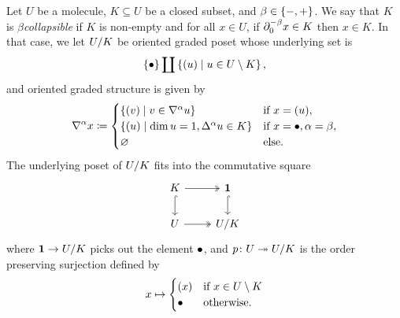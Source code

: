 \begin{dfn}  \label{dfn:collapsible}
    Let \( U \) be a molecule, \( K \subseteq U \) be a closed subset, and \( \beta \in \set{-, +} \).
    We say that \( K \) is \emph{\( \beta \)\nbd collapsible} if \( K \) is non-empty and for all \( x \in U \), if \( \bd{0}{-\beta} x \in K \) then \( x \in K \).
    In that case, we let \( \coll K U \) be oriented graded poset whose underlying set is
    \begin{equation*}
        \set{\zcoll} \coprod \set{\icoll u \mid u \in U \setminus K},
    \end{equation*}
    and oriented graded structure is given by
    \begin{equation*}
        \cofaces{}{\a} x \eqdef
        \begin{cases}
            \set{ \icoll v \mid v \in \cofaces{}{\a} u} & \text{if } x = \icoll u,\\
            \set{ \icoll u \mid \dim u = 1, \faces{}{\a} u \in K} &\text{if } x = \bullet, \a = \beta,\\
            \varnothing &\text{else.}
        \end{cases}
    \end{equation*}
    The underlying poset of \( \coll{K}{U} \) fits into the commutative square
    \begin{equation} \label{tik:square_collapse}
        \begin{tikzcd} 
            K & \pt \\
            U & {\coll K U}
            \arrow[""{name=0, anchor=center, inner sep=0}, two heads, from=1-1, to=1-2]
            \arrow[hook, from=1-1, to=2-1]
            \arrow[hook, from=1-2, to=2-2]
            \arrow[two heads, from=2-1, to=2-2]
        \end{tikzcd}
    \end{equation}
    where \( \pt \to \coll{K}{U} \) picks out the element \( \zcoll \), and \( \mapcoll \colon U \surj \coll{K}{U} \) is the order preserving surjection defined by
    \begin{equation*}
        x \mapsto
        \begin{cases}
            \icoll x & \text{if } x \in U \setminus K\\
            \zcoll & \text{otherwise.}
        \end{cases}
    \end{equation*}
\end{dfn}

